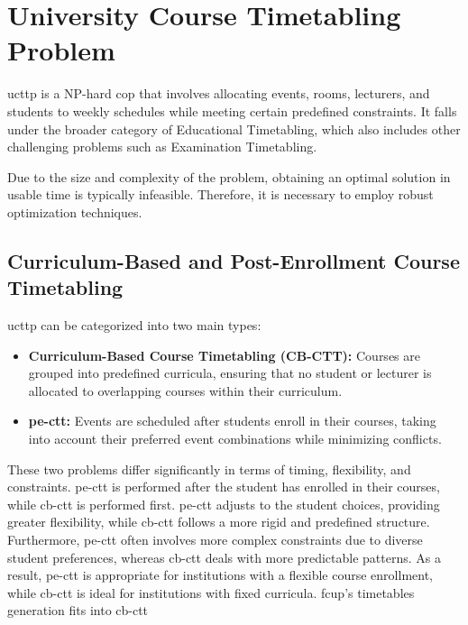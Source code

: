\section{University Course Timetabling Problem}

\ac{ucttp} is a NP-hard \ac{cop} that involves allocating events, rooms, lecturers, and students to weekly schedules while meeting certain predefined constraints. It falls under the broader category of Educational Timetabling, which also includes other challenging problems such as Examination Timetabling. 

Due to the size and complexity of the problem, obtaining an optimal solution in usable time is typically infeasible. Therefore, it is necessary to employ robust optimization techniques.

\subsection{Curriculum-Based and Post-Enrollment Course Timetabling}

\ac{ucttp} can be categorized into two main types:

\begin{itemize}
\item \textbf{Curriculum-Based Course Timetabling (CB-CTT):} Courses are grouped into predefined curricula, ensuring that no student or lecturer is allocated to overlapping courses within their curriculum.

\item \textbf{\ac{pe-ctt}:} Events are scheduled after students enroll in their courses, taking into account their preferred event combinations while minimizing conflicts.
\end{itemize}

These two problems differ significantly in terms of timing, flexibility, and constraints. \ac{pe-ctt} is performed after the student has enrolled in their courses, while \ac{cb-ctt} is performed first. \ac{pe-ctt} adjusts to the student choices, providing greater flexibility, while \ac{cb-ctt} follows a more rigid and predefined structure. Furthermore, \ac{pe-ctt} often involves more complex constraints due to diverse student preferences, whereas \ac{cb-ctt} deals with more predictable patterns. As a result, \ac{pe-ctt} is appropriate for institutions with a flexible course enrollment, while \ac{cb-ctt} is ideal for institutions with fixed curricula. \ac{fcup}'s timetables generation fits into \ac{cb-ctt}

